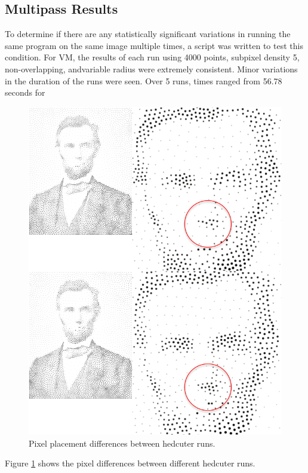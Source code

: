 \documentclass[11pt]{article}
\begin{document}
\subsection{Multipass Results}
To determine if there are any statistically significant variations in running the same program on the same image multiple times, a script was written to test this condition. For VM, the results of each run using 4000 points, subpixel density 5, non-overlapping, andvariable radius were extremely consistent. Minor variations in the duration of the runs were seen. Over 5 runs, times ranged from 56.78 seconds for

\begin{figure}[H]
	\centering
	\includegraphics[width=0.5\linewidth]{pix/2-1_hc_differences.png}
	\caption{Pixel placement differences between hedcuter runs.}
	\label{fig:differences1}
\end{figure}

Figure \ref{fig:differences1} shows the pixel differences between different hedcuter runs.
\end{document}
